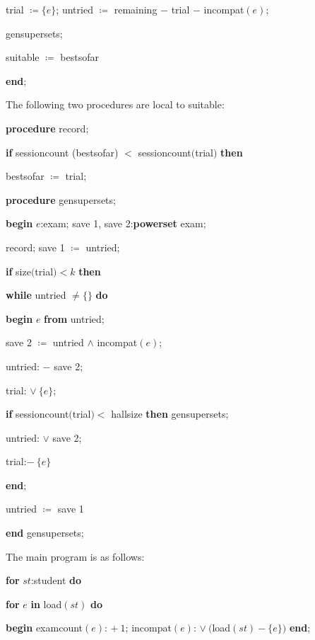 \documentclass[twoside,11pt]{book}
\begin{document}
\quad \quad trial $\coloneq \{e\}$; untried $\coloneq$ remaining $-$ trial $-$ incompat$(e)$;

\quad \quad gensupersets;

\quad \quad suitable $\coloneq$ bestsofar

\quad \textbf{end};

\noindent
The following two procedures are local to suitable:

\quad \textbf{procedure} record;

\quad \quad \textbf{if} sessioncount (bestsofar) $<$ sessioncount$($trial$)$ \textbf{then} 

\quad \quad \quad bestsofar $\coloneq$ trial;

\quad \textbf{procedure} gensupersets;

\quad \quad \textbf{begin} $e$:exam; save 1, save 2:\textbf{powerset} exam;

\quad \quad \quad record; save 1 $\coloneq$ untried;

\quad \quad \quad \textbf{if} size$($trial$) < k$ \textbf{then}

\quad \quad \quad \quad \textbf{while} untried $\neq \{\}$ \textbf{do}

\quad \quad \quad \quad \quad \textbf{begin} $e$ \textbf{from} untried;

\quad \quad \quad \quad \quad \quad save 2 $\coloneq$ untried $\wedge$ incompat$(e)$;

\quad \quad \quad \quad \quad \quad untried: $-$ save 2;

\quad \quad \quad \quad \quad \quad trial: $\vee\ \{e\}$;

\quad \quad \quad \quad \quad \quad \textbf{if} sessioncount$($trial$) <$ hallsize \textbf{then} gensupersets;

\quad \quad \quad \quad \quad \quad untried: $\vee$ save 2;

\quad \quad \quad \quad \quad \quad trial:$-\ \{e\}$

\quad \quad \quad \quad \quad \textbf{end};

\quad \quad \quad \quad untried $\coloneq$ save 1

\quad \textbf{end} gensupersets;

\noindent
The main program is as follows:

\quad \textbf{for} $st$:student \textbf{do}

\quad \quad \textbf{for} $e$ \textbf{in} load$(st)$ \textbf{do}

\quad \quad \quad \textbf{begin} examcount$(e)$: $+\ 1$; incompat$(e)$: $\vee\ ($load$(st) - \{e\})$ \textbf{end};
\end{document}
